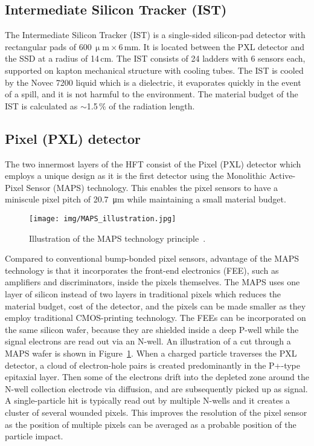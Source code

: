 \subsection{Intermediate Silicon Tracker (IST)}

The Intermediate Silicon Tracker (IST) is a single-sided silicon-pad detector with rectangular pads of $600\,\upmu\mathrm{m}\times6\,$mm. It is located between the PXL detector and the SSD at a radius of 14$\,$cm. The IST consists of 24 ladders with 6 sensors each, supported on kapton mechanical structure with cooling tubes. The IST is cooled by the Novec 7200 liquid which is a dielectric, it evaporates quickly in the event of a spill, and it is not harmful to the environment. The material budget of the IST is calculated as $\sim$1.5$\,\%$ of the radiation length.

\subsection{Pixel (PXL) detector}
The two innermost layers of the HFT consist of the Pixel (PXL) detector which employs a unique design as it is the
first detector using the Monolithic Active-Pixel Sensor (MAPS)
technology. This enables the pixel sensors to have a miniscule pixel pitch of \SI{20.7}{\micro\metre} while maintaining
a small material budget.

\begin{figure}[!htb]
\begin{center}
 \texttt{[image: img/MAPS\_illustration.jpg]}\\
\end{center}
\caption{\label{MAPS}Illustration of the MAPS technology principle~\cite{MAPS_illustration}.}
\end{figure}

Compared to conventional bump-bonded pixel sensors, advantage of the MAPS technology is that it incorporates the front-end electronics (FEE), such as amplifiers and discriminators, inside the pixels themselves. The MAPS uses one layer of silicon instead of two layers in traditional pixels which reduces the material budget, cost of the detector, and the pixels can be made smaller as they employ traditional CMOS-printing technology. The FEEs can be incorporated on the same silicon wafer, because they are shielded inside a deep P-well while the signal electrons are read out via an N-well. An illustration of a cut through a MAPS wafer is shown in Figure~\ref{MAPS}\@. When a charged particle traverses the PXL detector, a cloud of electron-hole pairs is created predominantly in the P+-type epitaxial layer. Then some of the electrons drift into the depleted zone around the N-well collection electrode via diffusion, and are subsequently picked up as signal. A single-particle hit is typically read out by multiple N-wells and it creates a cluster of several wounded pixels. This improves the resolution of the pixel sensor as the position of multiple pixels can be averaged as a probable position of the particle impact.

